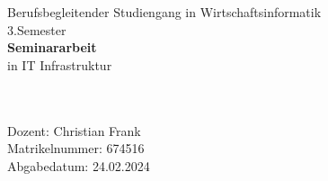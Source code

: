 \documentclass[
    12pt,
    bibliography=totoc,
    listof=totoc
]{scrartcl}
\begin{document}
\begin{titlepage}
{    %
        \begin{center}
            \normalsize{Berufsbegleitender Studiengang in Wirtschaftsinformatik} \\
            3.Semester \\
            \vspace{10mm}
            \large{\textbf{Seminararbeit}}\\
            in IT Infrastruktur \\
            \vspace{15mm}
            \fontsize{20pt}{20pt}\selectfont
            \textbf{\@title} \\
            \vspace{2mm}
            \fontsize{15pt}{15pt}\selectfont
            \@subtitle \\
            \vspace{15mm}
            \fontsize{15pt}{15pt}\selectfont
            \@author
            \vspace{30mm}
        \end{center}




        
        \begin{flushleft}
            \fontsize{12pt}{12pt}
            \selectfont
            Dozent: Christian Frank \\
             \vspace{5mm}
             Matrikelnummer: 674516\\
             \vspace{5mm}
             Abgabedatum: 24.02.2024\\
        \end{flushleft}
 
}\end{titlepage}
\end{document}
